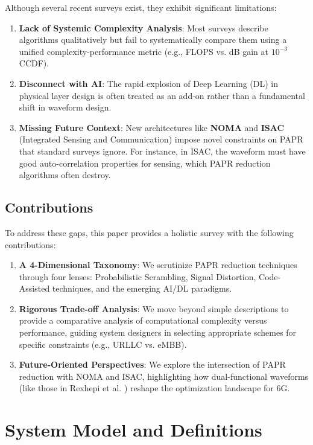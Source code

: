 \documentclass[conference]{IEEEtran}
\begin{document}
Although several recent surveys exist, they exhibit significant limitations:

\begin{enumerate}
    \item \textbf{Lack of Systemic Complexity Analysis}: Most surveys describe algorithms qualitatively but fail to systematically compare them using a unified complexity-performance metric (e.g., FLOPS vs. dB gain at $10^{-3}$ CCDF).
    \item \textbf{Disconnect with AI}: The rapid explosion of Deep Learning (DL) in physical layer design is often treated as an add-on rather than a fundamental shift in waveform design.
    \item \textbf{Missing Future Context}: New architectures like \textbf{NOMA} and \textbf{ISAC} (Integrated Sensing and Communication) impose novel constraints on PAPR that standard surveys ignore. For instance, in ISAC, the waveform must have good auto-correlation properties for sensing, which PAPR reduction algorithms often destroy.
\end{enumerate}

\subsection{Contributions}
To address these gaps, this paper provides a holistic survey with the following contributions:

\begin{enumerate}
    \item \textbf{A 4-Dimensional Taxonomy}: We scrutinize PAPR reduction techniques through four lenses: Probabilistic Scrambling, Signal Distortion, Code-Assisted techniques, and the emerging AI/DL paradigms.
    \item \textbf{Rigorous Trade-off Analysis}: We move beyond simple descriptions to provide a comparative analysis of computational complexity versus performance, guiding system designers in selecting appropriate schemes for specific constraints (e.g., URLLC vs. eMBB).
    \item \textbf{Future-Oriented Perspectives}: We explore the intersection of PAPR reduction with NOMA and ISAC, highlighting how dual-functional waveforms (like those in Rexhepi et al. \cite{ref4}) reshape the optimization landscape for 6G.
\end{enumerate}

\section{System Model and Definitions}
\end{document}

